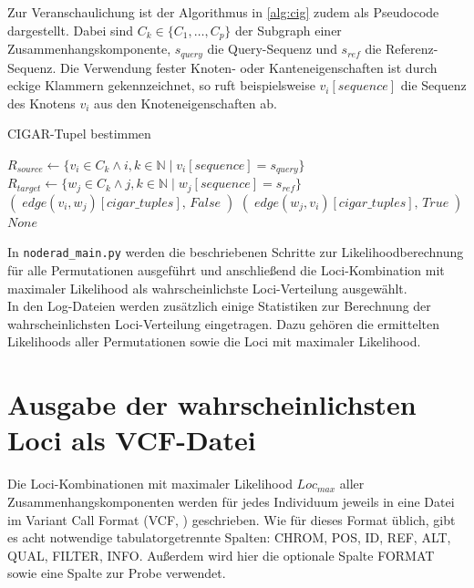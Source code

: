 Zur Veranschaulichung ist der Algorithmus in \ref{alg:cig} zudem als Pseudocode dargestellt. Dabei sind $ C_{k} \in \{C_{1}, \dots ,C_{p}\} $ der Subgraph einer Zusammenhangskomponente, $ s_{query} $ die Query-Sequenz und $ s_{ref} $ die Referenz-Sequenz. Die Verwendung fester Knoten- oder Kanteneigenschaften ist durch eckige Klammern gekennzeichnet, so ruft beispielsweise $v_{i}[sequence]$ die Sequenz des Knotens $v_{i}$ aus den Knoteneigenschaften ab. \\

\begin{algorithm}[H]
	\caption{CIGAR-Tupel bestimmen}  \label{alg:cig}
	\begin{algorithmic}[1]	
		\State $ R_{source} \gets \{v_{i} \in C_{k} \wedge i,k \in \mathds{N} \; |\; v_{i}[sequence]= s_{query} \}$
		\State $ R_{target} \gets \{w_{j} \in C_{k} \wedge j,k \in \mathds{N} \; |\; w_{j}[sequence]= s_{ref} \}$
		\State \Return $ (\;edge(v_{i}, w_{j})[cigar\_tuples],\, False\;) $		    
		\EndIf
		\State \Return $ (\;edge(w_{j}, v_{i})[cigar\_tuples],\, True\;) $		
		\EndIf
		\EndFor
		\EndFor
		\State \Return $ None $
		\EndFunction
	\end{algorithmic}
\end{algorithm}

In \lstinline|noderad_main.py| werden die beschriebenen Schritte zur Likelihoodberechnung für alle Permutationen ausgeführt und anschließend die Loci-Kombination mit maximaler Likelihood als wahrscheinlichste Loci-Verteilung ausgewählt.\\

In den Log-Dateien werden zusätzlich einige Statistiken zur Berechnung der wahrscheinlichsten Loci-Verteilung eingetragen. Dazu gehören die ermittelten Likelihoods aller Permutationen sowie die Loci mit maximaler Likelihood. \\

\section{Ausgabe der wahrscheinlichsten Loci als VCF-Datei} \label{sec:vcf}

Die Loci-Kombinationen mit maximaler Likelihood $Loc_{max}$ aller Zusammenhangskomponenten werden für jedes Individuum jeweils in eine Datei im Variant Call Format (VCF, \cite{danecek_2011}) geschrieben. Wie für dieses Format üblich, gibt es acht notwendige tabulatorgetrennte Spalten: CHROM, POS, ID, REF, ALT, QUAL, FILTER, INFO. Außerdem wird hier die optionale Spalte FORMAT sowie eine Spalte zur Probe verwendet. \\

